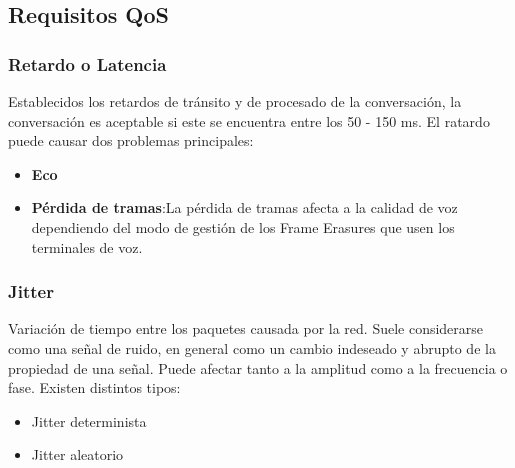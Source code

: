 \documentclass{beamer}
\begin{document}
\subsection{Requisitos QoS}
\begin{frame}
\frametitle{Retardo o Latencia}
		Establecidos los retardos de tránsito y de procesado de la conversación, la conversación es aceptable si este se encuentra entre los 50 - 150 ms. 
		El ratardo puede causar dos problemas principales:
			\begin{itemize}
				\item \textbf{Eco}
				\item \textbf{Pérdida de tramas}:La pérdida de tramas afecta a la calidad de voz dependiendo del modo de gestión de los Frame Erasures que usen los terminales de voz.
			\end{itemize}
\end{frame}
\begin{frame}
\frametitle{Jitter}
			Variación de tiempo entre los paquetes causada por la red. Suele considerarse como una señal de ruido, en general como un cambio indeseado y abrupto de la propiedad de una señal. Puede afectar tanto a la amplitud como a la frecuencia o fase.
			Existen distintos tipos:
				\begin{itemize}
				\item Jitter determinista
				\item Jitter aleatorio
				\end{itemize}
\end{frame}

\end{document}

